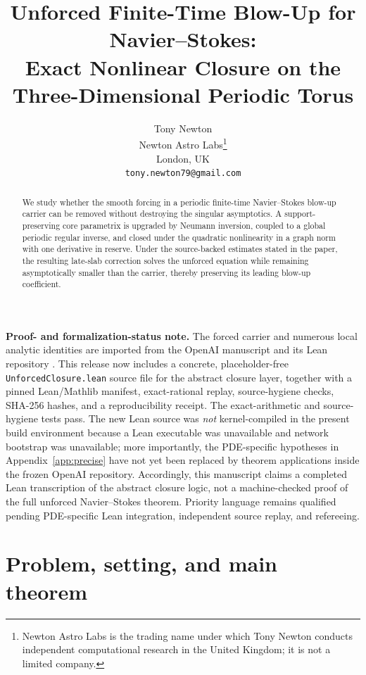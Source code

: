 \documentclass[11pt]{article}
\title{\textbf{Unforced Finite-Time Blow-Up for Navier--Stokes:}\\[0.2em]\textbf{Exact Nonlinear Closure on the Three-Dimensional Periodic Torus}}
\author{Tony Newton\\Newton Astro Labs\thanks{Newton Astro Labs is the trading name under which Tony Newton conducts independent computational research in the United Kingdom; it is not a limited company.}\\London, UK\\\texttt{tony.newton79@gmail.com}}
\date{}
\numberwithin{equation}{section}
\begin{document}
\maketitle

\begin{abstract}
We study whether the smooth forcing in a periodic finite-time Navier--Stokes blow-up carrier can be removed without destroying the singular asymptotics.  A support-preserving core parametrix is upgraded by Neumann inversion, coupled to a global periodic regular inverse, and closed under the quadratic nonlinearity in a graph norm with one derivative in reserve.  Under the source-backed estimates stated in the paper, the resulting late-slab correction solves the unforced equation while remaining asymptotically smaller than the carrier, thereby preserving its leading blow-up coefficient.
\end{abstract}

\noindent\textbf{Proof- and formalization-status note.}
The forced carrier and numerous local analytic identities are imported from the OpenAI manuscript and its Lean repository \cite{OpenAI2026NS,OpenAIRepo2026}.  This release now includes a concrete, placeholder-free \texttt{UnforcedClosure.lean} source file for the abstract closure layer, together with a pinned Lean/Mathlib manifest, exact-rational replay, source-hygiene checks, SHA-256 hashes, and a reproducibility receipt.  The exact-arithmetic and source-hygiene tests pass.  The new Lean source was \emph{not} kernel-compiled in the present build environment because a Lean executable was unavailable and network bootstrap was unavailable; more importantly, the PDE-specific hypotheses in Appendix~\ref{app:precise} have not yet been replaced by theorem applications inside the frozen OpenAI repository.  Accordingly, this manuscript claims a completed Lean transcription of the abstract closure logic, not a machine-checked proof of the full unforced Navier--Stokes theorem.  Priority language remains qualified pending PDE-specific Lean integration, independent source replay, and refereeing.

\tableofcontents

\section{Problem, setting, and main theorem}
\end{document}
